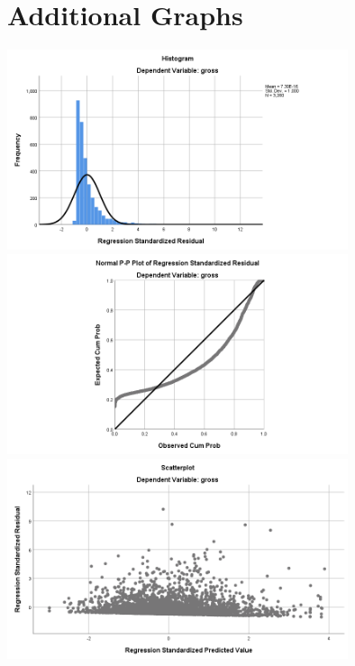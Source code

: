 \documentclass[font=10pt]{article}
\begin{document}
  \section{Additional Graphs}
\begin{center}
  \includegraphics[width=10cm]{graph1}
\newline
  \includegraphics[width=10cm]{graph2}
\newline
  \includegraphics[width=10cm]{graph3}
\newline

\end{center}
\end{document}
